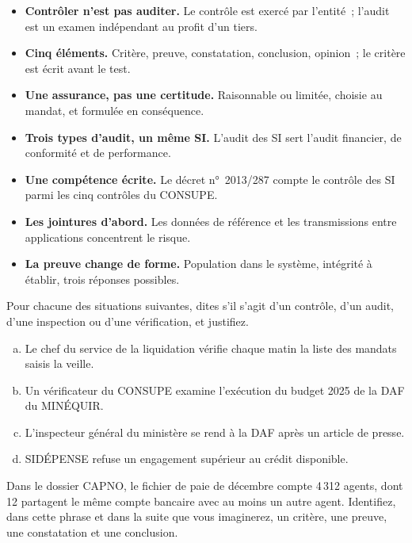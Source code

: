 \begin{boxresume}
\begin{itemize}
    \item \textbf{Contrôler n'est pas auditer.} Le contrôle est exercé par
          l'entité~; l'audit est un examen indépendant au profit d'un
          tiers.
    \item \textbf{Cinq éléments.} Critère, preuve, constatation,
          conclusion, opinion~; le critère est écrit avant le test.
    \item \textbf{Une assurance, pas une certitude.} Raisonnable ou limitée,
          choisie au mandat, et formulée en conséquence.
    \item \textbf{Trois types d'audit, un même SI.} L'audit des SI sert
          l'audit financier, de conformité et de performance.
    \item \textbf{Une compétence écrite.} Le décret n°~2013/287 compte le
          contrôle des SI parmi les cinq contrôles du CONSUPE.
    \item \textbf{Les jointures d'abord.} Les données de référence et les
          transmissions entre applications concentrent le risque.
    \item \textbf{La preuve change de forme.} Population dans le système,
          intégrité à établir, trois réponses possibles.
\end{itemize}
\end{boxresume}

\begin{boxexo}[title={\ding{45}\quad Exercice~1.1. Qui fait quoi~? \niveaubase}]
Pour chacune des situations suivantes, dites s'il s'agit d'un contrôle,
d'un audit, d'une inspection ou d'une vérification, et justifiez.
\begin{enumerate}[(a)]
    \item Le chef du service de la liquidation vérifie chaque matin la
          liste des mandats saisis la veille.
    \item Un vérificateur du CONSUPE examine l'exécution du budget 2025 de
          la DAF du MINÉQUIR.
    \item L'inspecteur général du ministère se rend à la DAF après un
          article de presse.
    \item SIDÉPENSE refuse un engagement supérieur au crédit disponible.
\end{enumerate}
\end{boxexo}

\begin{boxexo}[title={\ding{45}\quad Exercice~1.2. Les cinq éléments \niveaubase}]
Dans le dossier CAPNO, le fichier de paie de décembre compte 4\,312
agents, dont 12 partagent le même compte bancaire avec au moins un autre
agent. Identifiez, dans cette phrase et dans la suite que vous imaginerez,
un critère, une preuve, une constatation et une conclusion.
\end{boxexo}

